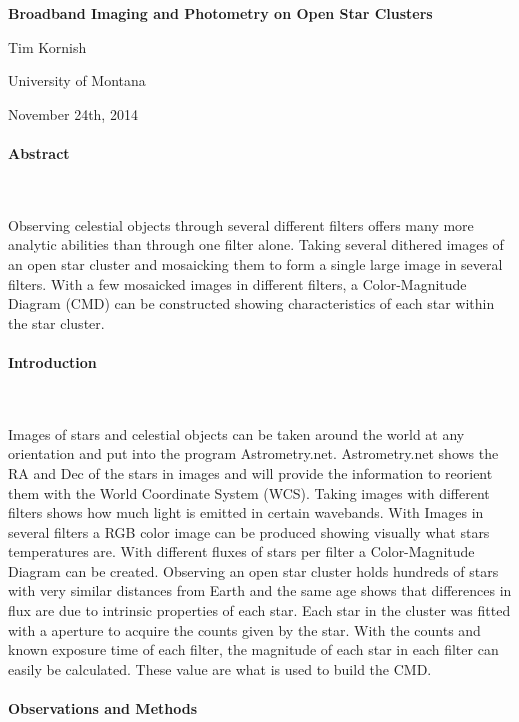 \documentclass[11pt,twocolumn]{article}
\begin{document}
\begin{center}

{\LARGE{\bf Broadband Imaging and Photometry on Open Star Clusters}}

{\large Tim Kornish}

University of Montana

November 24th, 2014
\end{center}

\paragraph{Abstract}

\ \

Observing celestial objects through several different filters offers many more analytic abilities than through one filter alone. Taking several dithered images of an open star cluster and mosaicking them to form a single large image in several filters. With a few mosaicked images in different filters, a Color-Magnitude Diagram (CMD) can be constructed showing characteristics of each star within the star cluster.

\paragraph{Introduction}

\ \

Images of stars and celestial objects can be taken around the world at any orientation and put into the program Astrometry.net. Astrometry.net shows the RA and Dec of the stars in images and will provide the information to reorient them with the World Coordinate System (WCS). Taking images with different filters shows how much light is emitted in certain wavebands. With Images in several filters a RGB color image can be produced showing visually what stars temperatures are. With different fluxes of stars per filter a Color-Magnitude Diagram can be created. Observing an open star cluster holds hundreds of stars with very similar distances from Earth and the same age shows that differences in flux are due to intrinsic properties of each star. Each star in the cluster was fitted with a aperture to acquire the counts given by the star. With the counts and known exposure time of each filter, the magnitude of each star in each filter can easily be calculated. These value are what is used to build the CMD.

\paragraph{Observations and Methods}
\end{document}
